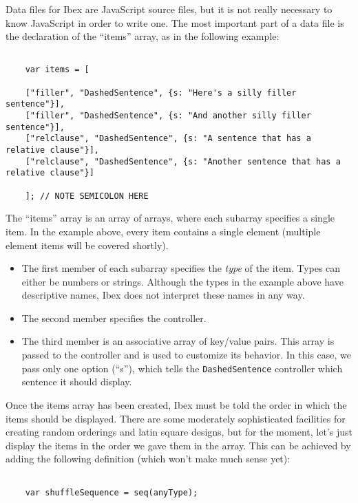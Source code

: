\documentclass[11pt,letterpaper]{article}
\begin{document}
Data files for Ibex are JavaScript source files, but it is not really
necessary to know JavaScript in order to write one.  The most important part
of a data file is the declaration of the ``items'' array, as in the following
example:
\footnotesize\begin{verbatim}

    var items = [

    ["filler", "DashedSentence", {s: "Here's a silly filler sentence"}],
    ["filler", "DashedSentence", {s: "And another silly filler sentence"}],
    ["relclause", "DashedSentence", {s: "A sentence that has a relative clause"}],
    ["relclause", "DashedSentence", {s: "Another sentence that has a relative clause"}]

    ]; // NOTE SEMICOLON HERE
\end{verbatim}

\smallskip\noindent\normalsize

The ``items'' array is an array of arrays, where each subarray specifies a single
item. In the example above, every item contains a single element (multiple
element items will be covered shortly).

\begin{itemize}

\item
 The first member of each subarray specifies the\textit{ type}  of the item.  Types can either be numbers or strings. Although the types in the example above have descriptive names, Ibex does not interpret these names in any way.
\item
 The second member specifies the controller.
\item
 The third member is an associative array of key/value pairs. This array is passed to the controller and is used to customize its behavior. In this case, we pass only one option (``s''), which tells the \texttt{DashedSentence} controller which sentence it should display.
\end{itemize}
Once the items array has been created, Ibex must be told the order in which
the items should be displayed. There are some moderately sophisticated
facilities for creating random orderings and latin square designs, but for the
moment, let's just display the items in the order we gave them in the array.
This can be achieved by adding the following definition (which won't make much
sense yet):
\footnotesize\begin{verbatim}

    var shuffleSequence = seq(anyType);
\end{verbatim}
\end{document}
